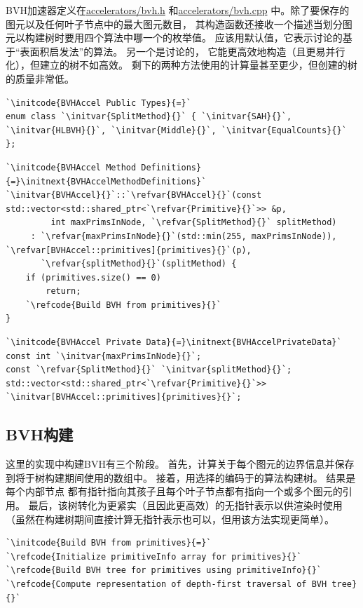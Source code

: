 BVH加速器{}定义在\href{https://github.com/mmp/pbrt-v3/tree/master/src/accelerators/bvh.h}{\ttfamily accelerators/bvh.h}
和\href{https://github.com/mmp/pbrt-v3/tree/master/src/accelerators/bvh.cpp}{\ttfamily accelerators/bvh.cpp}
中。除了要保存的图元以及任何叶子节点中的最大图元数目，
其构造函数还接收一个描述当划分图元以构建树时要用四个算法中哪一个的枚举值。
应该用默认值，它表示讨论的基于“表面积启发法”的算法。
另一个是讨论的，
它能更高效地构造（且更易并行化），但建立的树不如高效。
剩下的两种方法使用的计算量甚至更少，但创建的树的质量非常低。
\begin{lstlisting}
`\initcode{BVHAccel Public Types}{=}`
enum class `\initvar{SplitMethod}{}` { `\initvar{SAH}{}`, `\initvar{HLBVH}{}`, `\initvar{Middle}{}`, `\initvar{EqualCounts}{}` };
\end{lstlisting}
\begin{lstlisting}
`\initcode{BVHAccel Method Definitions}{=}\initnext{BVHAccelMethodDefinitions}`
`\initvar{BVHAccel}{}`::`\refvar{BVHAccel}{}`(const std::vector<std::shared_ptr<`\refvar{Primitive}{}`>> &p,
         int maxPrimsInNode, `\refvar{SplitMethod}{}` splitMethod)
     : `\refvar{maxPrimsInNode}{}`(std::min(255, maxPrimsInNode)), `\refvar[BVHAccel::primitives]{primitives}{}`(p),
       `\refvar{splitMethod}{}`(splitMethod) {
    if (primitives.size() == 0)
        return;
    `\refcode{Build BVH from primitives}{}`
}
\end{lstlisting}
\begin{lstlisting}
`\initcode{BVHAccel Private Data}{=}\initnext{BVHAccelPrivateData}`
const int `\initvar{maxPrimsInNode}{}`;
const `\refvar{SplitMethod}{}` `\initvar{splitMethod}{}`;
std::vector<std::shared_ptr<`\refvar{Primitive}{}`>> `\initvar[BVHAccel::primitives]{primitives}{}`;
\end{lstlisting}

\subsection{BVH构建}\label{sub:BVH构建}
这里的实现中构建BVH有三个阶段。
首先，计算关于每个图元的边界信息并保存到将于树构建期间使用的数组中。
接着，用选择的编码于的算法构建树。
结果是每个内部节点
都有指针指向其孩子且每个叶子节点都有指向一个或多个图元的引用。
最后，该树转化为更紧实（且因此更高效）的无指针表示以供渲染时使用
（虽然在构建树期间直接计算无指针表示也可以，但用该方法实现更简单）。
\begin{lstlisting}
`\initcode{Build BVH from primitives}{=}`
`\refcode{Initialize primitiveInfo array for primitives}{}`
`\refcode{Build BVH tree for primitives using primitiveInfo}{}`
`\refcode{Compute representation of depth-first traversal of BVH tree}{}`
\end{lstlisting}

